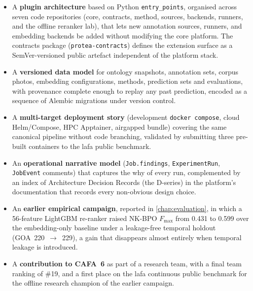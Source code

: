 \begin{itemize}
  \item A \textbf{plugin architecture} based on Python \texttt{entry\_points},
        organised across seven code repositories (core, contracts, method, sources,
        backends, runners, and the offline reranker lab), that lets new annotation
        sources, runners, and embedding backends be added without modifying the core
        platform. The contracts package (\texttt{protea-contracts}) defines the
        extension surface as a SemVer-versioned public artefact independent of the
        platform stack.

  \item A \textbf{versioned data model} for ontology snapshots, annotation sets, corpus
        photos, embedding configurations, methods, prediction sets and evaluations,
        with provenance complete enough to replay any past prediction, encoded as a
        sequence of Alembic migrations under version control.

  \item A \textbf{multi-target deployment story} (development \texttt{docker
        compose}, cloud Helm/Compose, HPC Apptainer, airgapped bundle) covering the
        same canonical pipeline without code branching, validated by submitting three
        pre-built containers to the \gls{lafa} public benchmark.

  \item An \textbf{operational narrative model} (\texttt{Job.findings},
        \texttt{ExperimentRun}, \texttt{JobEvent} comments) that captures the why of
        every run, complemented by an index of Architecture Decision Records (the
        D-series) in the platform's documentation that records every non-obvious design
        choice.

  \item An \textbf{earlier empirical campaign}, reported in \cref{chap:evaluation}, in
        which a 56-feature LightGBM re-ranker raised NK-BPO $F_{\max}$ from 0.431 to
        0.599 over the embedding-only baseline under a leakage-free temporal holdout
        (GOA~220~$\to$~229), a gain that disappears almost entirely when temporal
        leakage is introduced.

  \item A \textbf{contribution to CAFA~6} as part of a research team, with a final team
        ranking of \#19, and a first place on the \gls{lafa} continuous public
        benchmark for the offline research champion of the earlier campaign.
\end{itemize}

